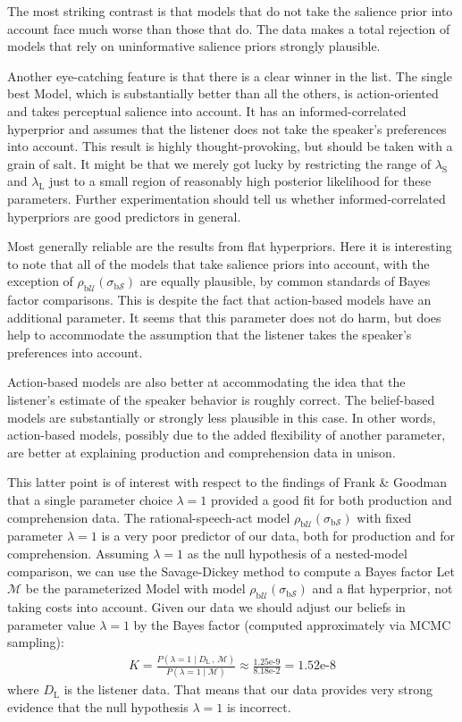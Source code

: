 The most striking contrast is that models that do not take the
salience prior into account face much worse than those that do. The
data makes a total rejection of models that rely on uninformative
salience priors strongly plausible.

Another eye-catching feature is that there is a clear winner in the
list. The single best Model, which is substantially better than all
the others, is action-oriented and takes perceptual salience into
account. It has an informed-correlated hyperprior and assumes that the
listener does not take the speaker's preferences into account. This
result is highly thought-provoking, but should be taken with a grain
of salt. It might be that we merely got lucky by restricting the range
of $\lambda_\mathrm{S}$ and $\lambda_\mathrm{L}$ just to a small
region of reasonably high posterior likelihood for these
parameters. Further experimentation should tell us whether
informed-correlated hyperpriors are good predictors in general.

Most generally reliable are the results from flat hyperpriors. Here it
is interesting to note that all of the models that take salience
priors into account, with the exception of
$\rho_{\mathrm{b}\mathcal{U}}(\sigma_{\mathrm{b}\mathcal{S}})$ are
equally plausible, by common standards of Bayes factor
comparisons. This is despite the fact that action-based models have an
additional parameter. It seems that this parameter does not do harm,
but does help to accommodate the assumption that the listener takes
the speaker's preferences into account. 

Action-based models are also better at accommodating the idea that the
listener's estimate of the speaker behavior is roughly correct. The
belief-based models are substantially or strongly less plausible in
this case. In other words, action-based models, possibly due to the
added flexibility of another parameter, are better at explaining
production and comprehension data in unison.

This latter point is of interest with respect to the findings of Frank
\& Goodman that a single parameter choice $\lambda=1$ provided a good
fit for both production and comprehension data. The
rational-speech-act model
$\rho_{\mathrm{b}\mathcal{U}}(\sigma_{\mathrm{b}\mathcal{S}})$ with
fixed parameter $\lambda=1$ is a very poor predictor of our data, both
for production and for comprehension. Assuming $\lambda =1$ as the
null hypothesis of a nested-model comparison, we can use the
Savage-Dickey method to compute a Bayes factor  Let
$\mathcal{M}$ be the parameterized Model with model
$\rho_{\mathrm{b}\mathcal{U}}(\sigma_{\mathrm{b}\mathcal{S}})$ and a
flat hyperprior, not taking costs into account. Given our data we
should adjust our beliefs in parameter value $\lambda=1$ by the Bayes
factor (computed approximately via MCMC sampling):
\begin{align*}
  K = \frac{P(\lambda=1 \mid D_\mathrm{L} \, , \, \mathcal{M})}{P(\lambda=1
    \mid \mathcal{M})} \approx \frac{1.25\text{e-9}}{8.18\text{e-2}} =
  1.52\text{e-8} 
\end{align*}
where $D_\mathrm{L}$ is the listener data. That means that our data
provides very strong evidence that the null hypothesis $\lambda=1$ is
incorrect.

